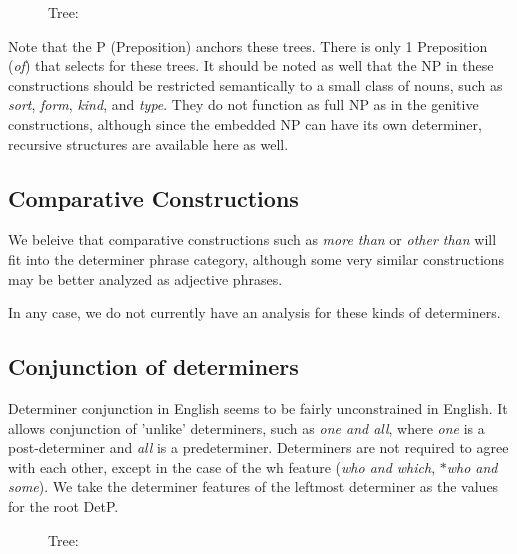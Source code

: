 \begin{figure}[ht]
\centering
{}
\caption{ Tree:  }
\end{figure}

Note that the P (Preposition) anchors these trees.  There is only 1 Preposition
({\it of}) that selects for these trees.  It should be noted as well that the NP in
these constructions should be restricted semantically to a small class of
nouns, such as {\it sort}, {\it form}, {\it kind}, and {\it type}.  They do not function as
full NP as in the genitive constructions, although since the embedded NP can
have its own determiner, recursive structures are available here as well.


\subsection{Comparative Constructions}

We beleive that comparative constructions such as {\it more than\/} or
{\it other than\/}
will fit into the determiner phrase category, although some very
similar constructions may be better analyzed  as adjective phrases.

    
In any case, we do not currently have an analysis for these kinds of
determiners.

\subsection{Conjunction of determiners}

Determiner conjunction in English seems to be  fairly unconstrained in English.  It allows conjunction of 'unlike'
determiners, such as {\it one and all}, where {\it one\/} is a post-determiner
and {\it all\/}
is a predeterminer.  Determiners are not required to agree with each other,
except in the case of the wh feature ({\it who and which}, {\it $\ast$who and some}).  We
take the determiner features of the leftmost determiner as the values for the
root DetP.

\begin{figure}[ht]
\centering
{}
\caption{ Tree:  }
\end{figure}

